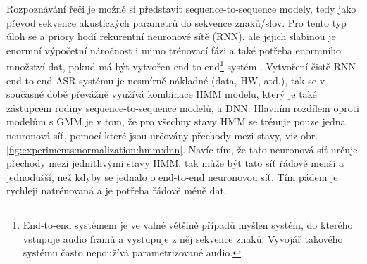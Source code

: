 Rozpoznávání řeči je možné si představit sequence-to-sequence modely, tedy jako převod sekvence akustických parametrů do sekvence znaků/slov. Pro tento typ úloh se a priory hodí rekurentní neuronové sítě (RNN), ale jejich slabinou je enormní výpočetní náročnost i mimo trénovací fázi a také potřeba enormního množství dat, pokud má být vytvořen end-to-end\footnote{End-to-end systémem je ve valné většině případů myšlen systém, do kterého vstupuje audio framů a  vystupuje z něj sekvence znaků. Vyvojář takového systému často nepoužívá parametrizované audio.} systém \cite{Hannun2014}. Vytvoření čistě RNN end-to-end ASR systému je nesmírně nákladné (data, HW, atd.), tak se v současné době převážně využívá kombinace HMM modelu, který je také zástupcem rodiny sequence-to-sequence modelů, a DNN. Hlavním rozdílem oproti modelům s GMM je v tom, že pro všechny stavy HMM se trénuje pouze jedna neuronová síť, pomocí které jsou určovány přechody mezi stavy, viz obr. \ref{fig:experiments:normalization:hmm:dnn}. Navíc tím, že tato neuronová síť určuje  přechody mezi jednitlivými stavy HMM, tak může být tato síť řádově menší a jednodušší, než kdyby se jednalo o end-to-end neuronovou síť. Tím pádem je rychleji natrénovaná a je potřeba řádově méně dat.


